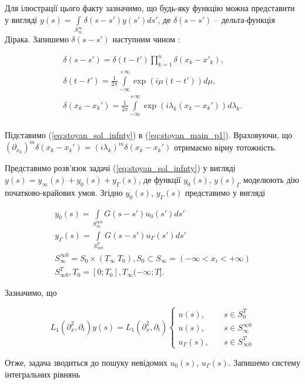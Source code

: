 Для ілюстрації цього факту  зазначимо, що будь-яку функцію можна представити у вигляді
$y(s)=\int\limits_{S_\infty^\infty}\delta(s-s')y(s')ds'$, де $\delta(s - s')$ – дельта-функція
Дірака. Запишемо $\delta(s - s')$ наступним чином
\cite{Korn-Spravochik}:

\begin{gather*}
\delta(s - s') = \delta(t - t')\prod_{k=1}^n\delta(x_k - x'_k), \\
\delta(t-t')=\frac{1}{2\pi}\int\limits_{-\infty}^{+\infty}\exp(i\mu(t-t'))d\mu, \\
\delta(x_k-x_k')=\frac{1}{2\pi}\int\limits_{-\infty}^{+\infty}\exp(i\lambda_k(x_k-x_k'))d\lambda_k. \\
\end{gather*}

Підставимо (\ref{eq:stoyan_sol_infnty}) в (\ref{eq:stoyan_main_p1}). Враховуючи, що
$(\partial_{x_k})^m\delta(x_k - x_k') = (i\lambda_k)^m\delta(x_k - x_k')$
отримаємо вірну тотожність.

Представимо розв’язок задачі (\ref{eq:stoyan_sol_infnty}) у вигляді
$y(s) = y_\infty(s) + y_0(s) + y_\Gamma(s)$, де функції
$y_0(s)$, $y(s)_\Gamma$  моделюють дію початково-крайових умов.
Згідно
\cite{Skopetskiy-Matematychne, Stoyan-Modeliuvannia} $y_0(s)$, $y_\Gamma(s)$ представимо у вигляді

\begin{gather*}
y_0(s) = \int\limits_{S_{\infty}^{\infty 0}}G(s-s')u_0(s')ds' \\
y_\Gamma(s) = \int\limits_{S_{\infty 0}^{T}}G(s-s')u_\Gamma(s')ds' \\
S_{\infty}^{\infty 0} = S_0 \times (T_\infty \ T_0), S_0 \subset S_\infty = (-\infty < x_i < +\infty) \\
S_{\infty 0}^{T}, T_0=[0; T_0], T_\infty(-\infty; T].
\end{gather*}

Зазначимо, що

\[
L_1(\partial_x^2, \partial_t)y(s) = L_1(\partial_x^2, \partial_t)\left\{
\begin{alignedat}{2}
u(s), & \quad s \in S_0^T \\
u(s), & \quad s \in S_{\infty}^{\infty 0} \\
u_\Gamma(s), & \quad s \in S_{\infty 0}^{T}
\end{alignedat}
\right.
\]

Отже, задача зводиться до пошуку невідомих $u_0(s)$, $u_\Gamma(s)$. Запишемо систему інтегральних рівнянь


